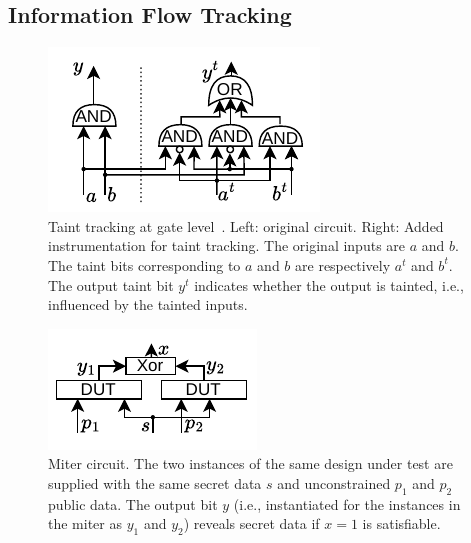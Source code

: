 \subsection{Information Flow Tracking}
\label{subsec:ift}

\begin{figure}[t]
    \begin{center}
    \includegraphics[width=0.5\columnwidth]{figures/glift/glift.pdf}
    \end{center}
    \vspace*{-1em}
    \caption{\label{fig:glift} Taint tracking at gate level~\cite{tiwari2009complete}. Left: original circuit. Right: Added instrumentation for taint tracking. The original inputs are $a$ and $b$. The taint bits corresponding to $a$ and $b$ are respectively $a^t$ and $b^t$. The output taint bit $y^t$ indicates whether the output is tainted, i.e., influenced by the tainted inputs.}
    \vspace*{-1em}
\end{figure}

\begin{figure}[t]
    \begin{center}
    \includegraphics[width=0.5\columnwidth]{figures/miter/miter.pdf}
    \end{center}
    \vspace*{-1em}
    \caption{\label{fig:miter} Miter circuit. The two instances of the same design under test are supplied with the same secret data $s$ and unconstrained $p_1$ and $p_2$ public data. The output bit $y$ (i.e., instantiated for the instances in the miter as $y_1$ and $y_2$) reveals secret data if $x=1$ is satisfiable.}
    \vspace*{-1em}
\end{figure}

